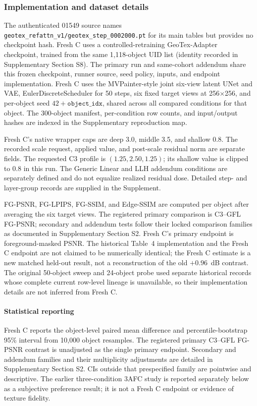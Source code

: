 \documentclass[times,twocolumn,final]{elsarticle}
\begin{document}
\subsubsection{Implementation and dataset details}

The authenticated 01549 source names \texttt{geotex\_refattn\_v1/geotex\_step\_0002000.pt} for its main tables but provides no checkpoint hash. Fresh C uses a controlled-retraining GeoTex-Adapter checkpoint, trained from the same 1,118-object UID list (identity recorded in Supplementary Section S8). The primary run and same-cohort addendum share this frozen checkpoint, runner source, seed policy, inputs, and endpoint implementation. Fresh C uses the MVPainter-style joint six-view latent UNet and VAE, EulerDiscreteScheduler for 50 steps, six fixed target views at 256$\times$256, and per-object seed $42+\texttt{object\_idx}$, shared across all compared conditions for that object. The 300-object manifest, per-condition row counts, and input/output hashes are indexed in the Supplementary reproduction map.

Fresh C's native wrapper caps are deep 3.0, middle 3.5, and shallow 0.8. The recorded scale request, applied value, and post-scale residual norm are separate fields. The requested C3 profile is $(1.25,2.50,1.25)$; its shallow value is clipped to 0.8 in this run. The Generic Linear and LLH addendum conditions are separately defined and do not equalize realized residual dose. Detailed step- and layer-group records are supplied in the Supplement.

FG-PSNR, FG-LPIPS, FG-SSIM, and Edge-SSIM are computed per object after averaging the six target views. The registered primary comparison is C3--GFL FG-PSNR; secondary and addendum tests follow their locked comparison families as documented in Supplementary Section S2. Fresh C's primary endpoint is foreground-masked PSNR. The historical Table~4 implementation and the Fresh C endpoint are not claimed to be numerically identical; the Fresh C estimate is a new matched held-out result, not a reconstruction of the old $+0.96$~dB contrast. The original 50-object sweep and 24-object probe used separate historical records whose complete current row-level lineage is unavailable, so their implementation details are not inferred from Fresh C.

\paragraph{Statistical reporting}
Fresh C reports the object-level paired mean difference and percentile-bootstrap 95\% interval from 10{,}000 object resamples. The registered primary C3--GFL FG-PSNR contrast is unadjusted as the single primary endpoint. Secondary and addendum families and their multiplicity adjustments are detailed in Supplementary Section S2. CIs outside that prespecified family are pointwise and descriptive. The earlier three-condition 3AFC study is reported separately below as a subjective preference result; it is not a Fresh C endpoint or evidence of texture fidelity.
\end{document}
